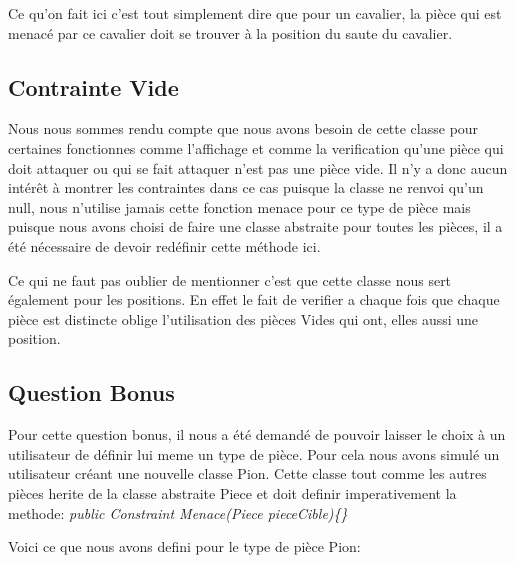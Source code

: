\documentclass[a4paper,10pt]{article}
\begin{document}
Ce qu'on fait ici c'est tout simplement dire que pour un cavalier, la pièce qui est menacé par ce cavalier doit se trouver à la position du saute du cavalier.

\subsection{Contrainte Vide}
Nous nous sommes rendu compte que nous avons besoin de cette classe pour certaines fonctionnes comme l'affichage et comme la verification qu'une pièce qui doit attaquer ou qui se fait attaquer n'est pas une pièce vide. Il n'y a donc aucun intérêt à montrer les contraintes dans ce cas puisque la classe ne renvoi qu'un null, nous n'utilise jamais cette fonction menace pour ce type de pièce mais puisque nous avons choisi de faire une classe abstraite pour toutes les pièces, il a été nécessaire de devoir redéfinir cette méthode ici.

Ce qui ne faut pas oublier de mentionner c'est que cette classe nous sert également pour les positions. En effet le fait de verifier a chaque fois que chaque pièce est distincte oblige l'utilisation des pièces Vides qui ont, elles aussi une position.

\subsection{Question Bonus}
\par Pour cette question bonus, il nous a été demandé de pouvoir laisser le choix à un utilisateur de définir lui meme un type de pièce. Pour cela nous avons simulé un utilisateur créant une nouvelle classe Pion. Cette classe tout comme les autres pièces herite de la classe abstraite Piece et doit definir imperativement la methode: \textit{public Constraint Menace(Piece pieceCible)\{\}}

Voici ce que nous avons defini pour le type de pièce Pion:
\end{document}
